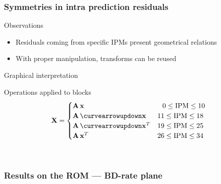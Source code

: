 \documentclass[10pt]{beamer} %
\makeatletter
\newcommand*{\currentname}{\@currentlabelname}
\def\x{\mathbf{x}}
\def\X{\mathbf{X}}
\def\A{\mathbf{A}}
\makeatother
\begin{document}
\subsubsection{Symmetries in intra prediction residuals}

\begin{frame}{\currentname}
	\begin{block}{Observations}
		\begin{itemize}
			\item Residuals coming from specific IPMs present geometrical
				relations
			\item With proper manipulation, transforms can be reused
		\end{itemize}
	\end{block}
	\vspace{-0.5em}
	\begin{minipage}{0.48\textwidth}
		\begin{block}{Graphical interpretation}
			\centering
			
		\end{block}
	\end{minipage}
	\hfill
	\begin{minipage}{0.48\textwidth}
		\begin{block}{Operations applied to blocks}
			$$\X =
			\begin{cases}
				\A \, \x & \;\;\, 0 \le \text{IPM} \le 10 \\
				\A \, \curvearrowupdown\x & 11 \le \text{IPM} \le 18 \\
				\A \, \curvearrowupdown\x^T & 19 \le \text{IPM} \le 25 \\
				\A \, \x^T & 26 \le \text{IPM} \le 34 \\
			\end{cases}$$
		\end{block}
		\vfill$\,$
	\end{minipage}
\end{frame}

\subsubsection{Results on the ROM --- BD-rate plane}

\begin{frame}{\currentname}

	
\end{frame}
\end{document}

